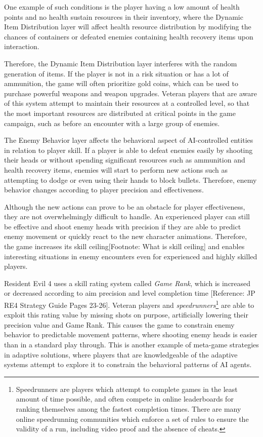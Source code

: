 \documentclass[cic,tc,english]{iiufrgs}
\begin{document}
One example of such conditions is the player having a low amount of health points and no health sustain resources in their inventory, where the Dynamic Item Distribution layer will affect health resource distribution by modifying the chances of containers or defeated enemies containing health recovery items upon interaction.

Therefore, the Dynamic Item Distribution layer interferes with the random generation of items. If the player is not in a risk situation or has a lot of ammunition, the game will often prioritize gold coins, which can be used to purchase powerful weapons and weapon upgrades.  Veteran players that are aware of this system attempt to maintain their resources at a controlled level, so that the most important resources are distributed at critical points in the game campaign, such as before an encounter with a large group of enemies.

The Enemy Behavior layer affects the behavioral aspect of AI-controlled entities in relation to player skill. If a player is able to defeat enemies easily by shooting their heads or without spending significant resources such as ammunition and health recovery items, enemies will start to perform new actions such as attempting to dodge or even using their hands to block bullets. Therefore, enemy behavior changes according to player precision and effectiveness.

Although the new actions can prove to be an obstacle for player effectiveness, they are not overwhelmingly difficult to handle. An experienced player can still be effective and shoot enemy heads with precision if they are able to predict enemy movement or quickly react to the new character animations. Therefore, the game increases its skill ceiling[Footnote: What is skill ceiling] and enables interesting situations in enemy encounters even for experienced and highly skilled players. 

Resident Evil 4 uses a skill rating system called \emph{Game Rank}, which is increased or decreased according to aim precision and level completion time [Reference: JP RE4 Strategy Guide Pages 23-26]. Veteran players and \emph{speedrunners}\footnote{Speedrunners are players which attempt to complete games in the least amount of time possible, and often compete in online leaderboards for ranking themselves among the fastest completion times. There are many online speedrunning communities which enforce a set of rules to ensure the validity of a run, including video proof and the absence of cheats.} are able to exploit this rating value by missing shots on purpose, artificially lowering their precision value and Game Rank. This causes the game to constrain enemy behavior to predictable movement patterns, where shooting enemy heads is easier than in a standard play through. This is another example of meta-game strategies in adaptive solutions, where players that are knowledgeable of the adaptive systems attempt to explore it to constrain the behavioral patterns of AI agents.
\end{document}
